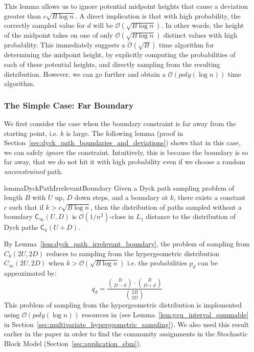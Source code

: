 This lemma allows us to ignore potential midpoint heights that cause a deviation greater than $c \sqrt{B\log n}$.
A direct implication is that with high probability, the correctly sampled value for $d$ will be $\mathcal O(\sqrt{B\log n})$.
In other words, the height of the midpoint takes on one of only  $\mathcal O(\sqrt{B\log n})$ distinct values with high probability.
This immediately suggests a $\widetilde{\mathcal O}(\sqrt{B})$ time algorithm for determining the midpoint height,
by explicitly computing the probabilities of each of these potential heights, and directly sampling from the resulting distribution.
However, we can go further and obtain a $\mathcal O(poly(\log n))$ time algorithm.


\subsubsection{The Simple Case: Far Boundary}%
\label{sec:the_simple_case}
We first consider the case when the boundary constraint is far away from the starting point, i.e. $k$ is large.
The following lemma (proof in Section~\ref{sec:dyck_path_boundaries_and_deviations}) shows that in this case,
we can safely \emph{ignore} the constraint.  Intuitively, this is because the boundary is so far away,
that we do not hit it with high probability even if we choose a random \emph{unconstrained} path.
\begin{restatable}{lemma}{DyckPathIrrelevantBoundary}
\label{lem:dyck_path_irrelevant_boundary}
Given a Dyck path sampling problem of length $B$ with $U$ up, $D$ down steps, and a boundary at $k$,
there exists a constant $c$ such that if $k > c \sqrt{B\log n}$, then the distribution of paths sampled without a boundary $\mathsf C_{\infty}(U,D)$
is $\mathcal O(1/n^2)$-close in $L_1$ distance to the distribution of Dyck paths $\mathsf C_k(U+D)$.
\end{restatable}
By Lemma~\ref{lem:dyck_path_irrelevant_boundary}, the problem of sampling from $C_k(2U,2D)$
reduces to sampling from the hypergeometric distribution $C_{\infty}(2U,2D)$ when $k>\mathcal{O}(\sqrt{B\log n})$
i.e. the probabilities $p_d$ can be approximated by:
\[
q_d = \frac{{{B}\choose{D-d}}\cdot{{B}\choose{D+d}}}{{{2B}\choose{2D}}}
\]
This problem of sampling from the hypergeometric distribution is implemented using $\mathcal O(poly(\log n))$ resources in \cite{huge}
(see Lemma~\ref{lem:ggn_interval_summable} in Section~\ref{sec:multivariate_hypergeometric_sampling}).
We also used this result earlier in the paper in order to find the community assignments in the Stochastic Block Model
(Section~\ref{sec:application_sbm}).

